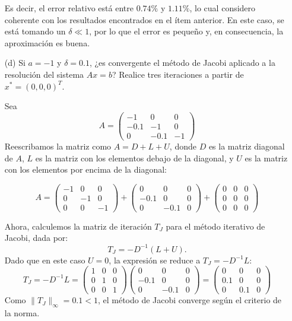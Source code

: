 \begin{homeworkProblem}
\begin{enumerate}
\begin{solucion}
Es decir, el error relativo está entre $0.74\%$ y $1.11\%$, lo cual considero coherente con los resultados encontrados en el ítem anterior. En este caso, se está tomando un $\delta \ll 1$, por lo que el error es pequeño y, en consecuencia, la aproximación es buena.  
    \end{solucion}
    \item[(d)] Si \( a = -1 \) y \( \delta = 0.1 \), ¿es convergente el método de Jacobi aplicado a la resolución del sistema \( Ax = b \)?  
    Realice tres iteraciones a partir de $x^* =  \left(0, 0,  0\right)^T$.
    \begin{solucion}
      Sea
\[
A = \begin{pmatrix}
            -1 & 0 & 0\\
            -0.1 & -1 & 0\\
            0 & -0.1 & -1
        \end{pmatrix}
\]
Reescribamos la matriz como $ A = D + L + U $, donde $ D $ es la matriz diagonal de $ A $, $ L $ es la matriz con los elementos debajo de la diagonal, y $ U $ es la matriz con los elementos por encima de la diagonal:

\[
A = \begin{pmatrix}
            -1 & 0 & 0\\
            0 & -1 & 0\\
            0 & 0 & -1
        \end{pmatrix}+
        \begin{pmatrix}
            0 & 0 & 0\\
            -0.1 & 0 & 0\\
            0 & -0.1 & 0
        \end{pmatrix}+
        \begin{pmatrix}
            0 & 0 & 0\\
            0 & 0 & 0\\
            0 & 0 & 0
        \end{pmatrix}
\]

Ahora, calculemos la matriz de iteración $ T_J $ para el método iterativo de Jacobi, dada por:
\[
T_J = -D^{-1}(L+U).
\]
Dado que en este caso $ U = 0 $, la expresión se reduce a $ T_J = -D^{-1} L $:
\[
T_J = -D^{-1} L =
\begin{pmatrix}
        1 & 0 & 0\\
        0 & 1 & 0\\
        0 & 0 & 1
\end{pmatrix}
\begin{pmatrix}
            0 & 0 & 0\\
            -0.1 & 0 & 0\\
            0 & -0.1 & 0
\end{pmatrix}
=
\begin{pmatrix}
            0 & 0 & 0\\
            0.1 & 0 & 0\\
            0 & 0.1 & 0
\end{pmatrix}
\]
Como $ \|T_J\|_\infty = 0.1 < 1 $, el método de Jacobi converge según el criterio de la norma.


\end{solucion}
\end{enumerate}
\end{homeworkProblem}
